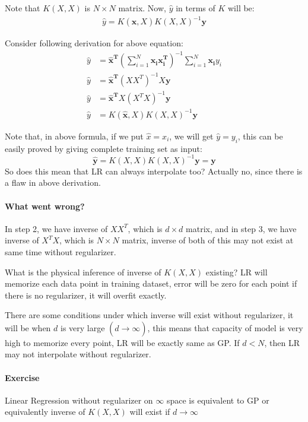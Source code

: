 \documentclass[12pt]{article}
\begin{document}
Note that $K(X,X)$ is $N\times N$ matrix. Now, $\hat{y}$ in terms of $K$ will be: 
\begin{align}
    \hat{y} = K(\mathbf{\hat{x}}, X) K(X,X)^{-1}\mathbf{y}
\end{align}

Consider following derivation for above equation:
\begin{align*}
      \hat{y} &= \mathbf{\hat{x}^T} (\sum_{i=1}^N \mathbf{x_i x_i^T})^{-1} \sum_{i=1}^N\mathbf{x_i}y_i \\
      \hat{y} &= \mathbf{\hat{x}^T} (XX^T)^{-1} X \mathbf{y}\\
      \hat{y} &= \mathbf{\hat{x}^T} X (X^TX)^{-1} \mathbf{y} \\
      \hat{y} &= K(\mathbf{\hat{x}}, X) K(X,X)^{-1} \mathbf{y}
\end{align*}

Note that, in above formula, if we put $\hat{x} = x_i$, we will get $\hat{y} = y_i$, this can be easily proved by giving complete training set as input:
$$\mathbf{\hat{y}} = K(X,X)K(X,X)^{-1} \mathbf{y} = \mathbf{y}$$
So does this mean that LR can always interpolate too? Actually no, since there is a flaw in above derivation. 

\paragraph{What went wrong?}In step 2, we have inverse of $XX^T$, which is $d \times d$ matrix, and in step 3, we have inverse of $X^TX$, which is $N \times N$ matrix, inverse of both of this may not exist at same time without regularizer.

What is the physical inference of inverse of $K(X,X)$ existing? LR will memorize each data point in training dataset, error will be zero for each point if there is no regularizer, it will overfit exactly.

There are some conditions under which inverse will exist without regularizer, it will be when $d$ is very large $(d \xrightarrow[]{} \infty)$, this means that capacity of model is very high to memorize every point, LR will be exactly same as GP. If $d < N$, then LR may not interpolate without regularizer.

\paragraph{Exercise} Linear Regression without regularizer on $\infty$ space is equivalent to GP or equivalently inverse of $K(X,X)$ will exist if $d \xrightarrow[]{} \infty$
\end{document}
